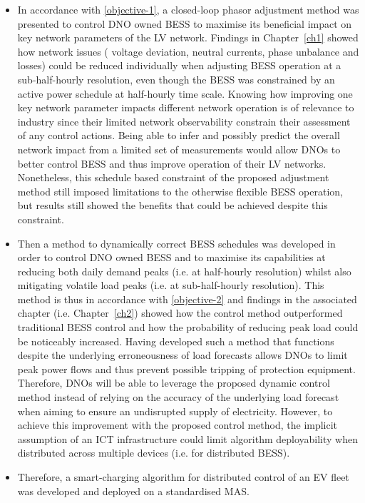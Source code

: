 \begin{itemize}
	\item
	In accordance with \ref{objective-1}, a closed-loop phasor adjustment method was presented to control DNO owned BESS to maximise its beneficial impact on key network parameters of the LV network.
	Findings in Chapter~\ref{ch1} showed how network issues ( voltage deviation, neutral currents, phase unbalance and losses) could be reduced individually when adjusting BESS operation at a sub-half-hourly resolution, even though the BESS was constrained by an active power schedule at half-hourly time scale.
	Knowing how improving one key network parameter impacts different network operation is of relevance to industry since their limited network observability constrain their assessment of any control actions.
	Being able to infer and possibly predict the overall network impact from a limited set of measurements would allow DNOs to better control BESS and thus improve operation of their LV networks.
	Nonetheless, this schedule based constraint of the proposed adjustment method still imposed limitations to the otherwise flexible BESS operation, but results still showed the benefits that could be achieved despite this constraint.
	\item
	Then a method to dynamically correct BESS schedules was developed in order to control DNO owned BESS and to maximise its capabilities at reducing both daily demand peaks (i.e. at half-hourly resolution) whilst also mitigating volatile load peaks (i.e. at sub-half-hourly resolution).
	This method is thus in accordance with \ref{objective-2} and findings in the associated chapter (i.e. Chapter~\ref{ch2}) showed how the control method outperformed traditional BESS control and how the probability of reducing peak load could be noticeably increased.
	Having developed such a method that functions despite the underlying erroneousness of load forecasts allows DNOs to limit peak power flows and thus prevent possible tripping of protection equipment.
	Therefore, DNOs will be able to leverage the proposed dynamic control method instead of relying on the accuracy of the underlying load forecast when aiming to ensure an undisrupted supply of electricity.
	However, to achieve this improvement with the proposed control method, the implicit assumption of an ICT infrastructure could limit algorithm deployability when distributed across multiple devices (i.e. for distributed BESS).
	\item
	Therefore, a smart-charging algorithm for distributed control of an EV fleet was developed and deployed on a standardised MAS.

\end{itemize}
